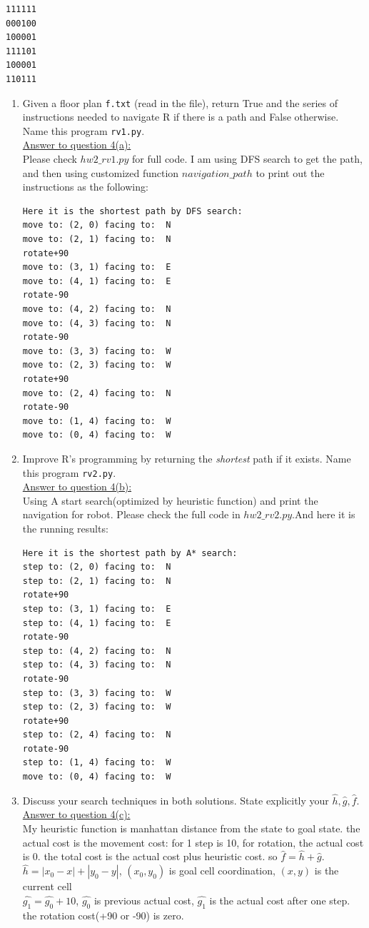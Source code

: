 \documentclass{article}
\begin{document}
\begin{enumerate}
\begin{verbatim}
111111
000100
100001
111101
100001
110111
\end{verbatim}
\begin{enumerate}
\item Given a floor plan \texttt{f.txt} (read in the file),  return \textsf{True} and the series of instructions needed to navigate \textsf{R} if there is a path and \textsf{False} otherwise.  Name this program \texttt{rv1.py}.\\
\underline{Answer to question 4(a):}\\
Please check $hw2\_rv1.py$ for full code. I am using DFS search to get the path, and then using customized function $navigation\_path$ to print out the instructions as the following:
\begin{verbatim}
Here it is the shortest path by DFS search:
move to: (2, 0) facing to:  N
move to: (2, 1) facing to:  N
rotate+90
move to: (3, 1) facing to:  E
move to: (4, 1) facing to:  E
rotate-90
move to: (4, 2) facing to:  N
move to: (4, 3) facing to:  N
rotate-90
move to: (3, 3) facing to:  W
move to: (2, 3) facing to:  W
rotate+90
move to: (2, 4) facing to:  N
rotate-90
move to: (1, 4) facing to:  W
move to: (0, 4) facing to:  W
\end{verbatim}
\item Improve \textsf{R}'s programming by returning the {\it shortest} path if it exists.  Name this program \texttt{rv2.py}.\\
\underline{Answer to question 4(b):}\\
Using A start search(optimized by heuristic function) and print the navigation for robot. Please check the full code in $hw2\_rv2.py$.And here it is the running results:
\begin{verbatim}
Here it is the shortest path by A* search:
step to: (2, 0) facing to:  N
step to: (2, 1) facing to:  N
rotate+90
step to: (3, 1) facing to:  E
step to: (4, 1) facing to:  E
rotate-90
step to: (4, 2) facing to:  N
step to: (4, 3) facing to:  N
rotate-90
step to: (3, 3) facing to:  W
step to: (2, 3) facing to:  W
rotate+90
step to: (2, 4) facing to:  N
rotate-90
step to: (1, 4) facing to:  W
move to: (0, 4) facing to:  W
\end{verbatim}
\item Discuss your search techniques in both solutions.   State explicitly your $\hat{h}, \hat{g}, \hat{f}$.\\
\underline{Answer to question 4(c):}\\
My heuristic function is manhattan distance from the state to goal state. the actual cost is the movement cost: for 1 step is 10, for rotation, the actual cost is 0. the total cost is the actual cost plus heuristic cost.
so $\hat{f}=\hat{h}+\hat{g}$.\\
$\hat{h}=|x_0-x|+|y_0-y|$,   $(x_0,y_0)$ is goal cell coordination, $(x,y)$ is the current cell\\
$\hat{g_1}=\hat{g_0}+10$, $\hat{g_0}$ is previous actual cost, $\hat{g_1}$ is the actual cost after one step.\\
the rotation cost(+90 or -90) is zero.


\end{enumerate}
\end{enumerate}
\end{document}
